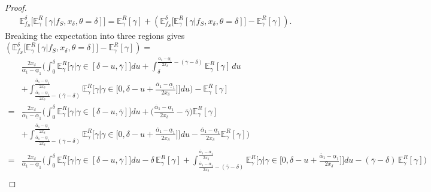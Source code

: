 \documentclass[11pt,dvipsnames]{article}
\begin{document}
\begin{appendix}
\begin{proof}
\begin{align*}
\mathbb{E}_{f_S}^\delta\big[\mathbb{E}_\gamma^R[\gamma|f_S,x_\delta,\theta=\delta]\big] = 	\mathbb{E}_\gamma^R[\gamma]+
(\mathbb{E}_{f_S}^\delta\big[\mathbb{E}_\gamma^R[\gamma|f_S,x_\delta,\theta=\delta]\big]-\mathbb{E}_\gamma^R[\gamma]).
\end{align*}
Breaking the expectation into three regions gives $(\mathbb{E}_{f_S}^\delta\big[\mathbb{E}_\gamma^R[\gamma|f_S,x_\delta,\theta=\delta]\big]-\mathbb{E}_\gamma^R[\gamma])=$
\begin{align*}
&\frac{2x_\delta}{\overline{\alpha}_1-\underline{\alpha}_1}\bigg(
\int_0^\delta \mathbb{E}_\gamma^R\big[\gamma| \gamma \in [\delta -u,\overline{\gamma}]\big]du
+\int_\delta^{\frac{\overline{\alpha}_1-\underline{\alpha}_1}{2x_\delta}-(\overline{\gamma}-\delta)} \mathbb{E}_\gamma^R[\gamma]\,du
\\
&+\int_{\frac{\overline{\alpha}_1-\underline{\alpha}_1}{2x_\delta}-(\overline{\gamma}-\delta)}^{\frac{\overline{\alpha}_1-\underline{\alpha}_1}{2x_\delta}} \mathbb{E}_\gamma^R\Big[\gamma\Big| \gamma \in \Big[0,\delta -u+ \frac{\overline{\alpha}_1-\underline{\alpha}_1}{2x_\delta}\Big]\Big]du\bigg)-\mathbb{E}_\gamma^R[\gamma]
\\
=&\frac{2x_\delta}{\overline{\alpha}_1-\underline{\alpha}_1}\bigg(
\int_0^\delta \mathbb{E}_\gamma^R\big[\gamma| \gamma \in [\delta -u,\overline{\gamma}]\big]du
+\Big(\frac{\overline{\alpha}_1-\underline{\alpha}_1}{2x_\delta}-\overline{\gamma}\Big)\mathbb{E}_\gamma^R[\gamma]
\\
&
+\int_{\frac{\overline{\alpha}_1-\underline{\alpha}_1}{2x_\delta}-(\overline{\gamma}-\delta)}^{\frac{\overline{\alpha}_1-\underline{\alpha}_1}{2x_\delta}} \mathbb{E}_\gamma^R\Big[\gamma\Big| \gamma \in \Big[0,\delta -u+ \frac{\overline{\alpha}_1-\underline{\alpha}_1}{2x_\delta}\Big]\Big]du
-\frac{\overline{\alpha}_1-\underline{\alpha}_1}{2x_\delta}\mathbb{E}_\gamma^R[\gamma]\bigg)
\\
=&\frac{2x_\delta}{\overline{\alpha}_1-\underline{\alpha}_1}\bigg(
\int_0^\delta \mathbb{E}_\gamma^R\big[\gamma| \gamma \in [\delta -u,\overline{\gamma}]\big]du-\delta\,\mathbb{E}_\gamma^R[\gamma]
+\int_{\frac{\overline{\alpha}_1-\underline{\alpha}_1}{2x_\delta}-(\overline{\gamma}-\delta)}^{\frac{\overline{\alpha}_1-\underline{\alpha}_1}{2x_\delta}} \mathbb{E}_\gamma^R\Big[\gamma\Big| \gamma \in \Big[0,\delta -u+ \frac{\overline{\alpha}_1-\underline{\alpha}_1}{2x_\delta}\Big]\Big]du-(\overline{\gamma}-\delta)\,\mathbb{E}_\gamma^R[\gamma]\bigg)
\\

\end{align*}
\end{proof}
\end{appendix}
\end{document}
